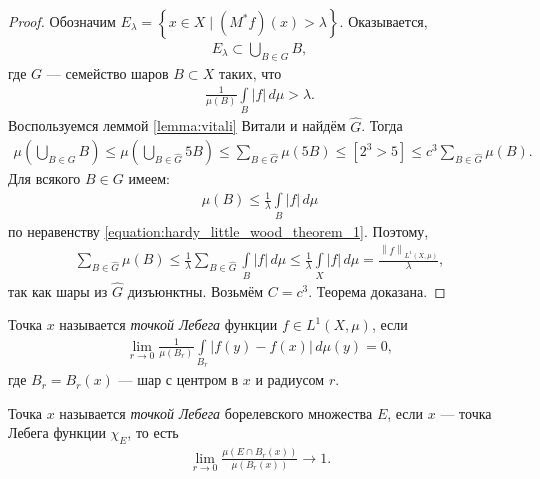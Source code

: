 \begin{proof}
 Обозначим $E_{\lambda} = \left\{ x \in X \mid (M^{\ast}f)(x) > \lambda \right\}$. Оказывается, \begin{align}
  \label{equation:hardy_little_wood_theorem_1}
  E_{\lambda} \subset \bigcup_{B \in G}  B
 ,\end{align} где $G$ --- семейство шаров $B \subset X$ таких, что \begin{align*}
  \frac{1}{\mu(B)} \int\limits_{B} \left| f \right| \, d\mu   > \lambda
 .\end{align*} Воспользуемся леммой \ref{lemma:vitali} Витали и найдём $\hat G$. Тогда \begin{align*}
 \mu \left( \bigcup_{B \in G} B \right) \leqslant \mu \left( \bigcup_{B \in \hat G} 5B  \right) \leqslant \sum_{B \in \hat G} \mu(5B) \leqslant [2^{3} > 5] \leqslant c^{3} \sum_{B \in \hat G}  \mu(B).
 \end{align*} Для всякого $B \in G$ имеем: \begin{align*}
 \mu(B) \leqslant \frac{1}{\lambda} \int\limits_{B} \left| f \right| \, d\mu
 \end{align*} по неравенству \eqref{equation:hardy_little_wood_theorem_1}. Поэтому, \begin{align*}
 \sum_{B \in \hat G}  \mu(B) \leqslant \frac{1}{\lambda} \sum_{B \in \hat G}  \int\limits_{B} \left| f \right| \, d\mu   \leqslant \frac{1}{\lambda} \int\limits_{X} \left| f \right| \, d\mu   = \frac{\left\| f \right\|_{L^{1}(X,\mu)}}{\lambda}
 ,\end{align*} так как шары из $\hat G$ дизъюнктны. Возьмём $C = c^{3}$. Теорема доказана.
\end{proof}
\begin{df}
 Точка $x$ называется \textit{точкой Лебега} функции  $f \in L^{1}(X,\mu)$, если \begin{align*}
  \lim_{r \to 0} \frac{1}{\mu(B_{r})} \int\limits_{B_{r}} \left| f(y) - f(x) \right| \, d\mu (y) = 0
 ,\end{align*} где $B_r = B_r(x)$ --- шар с центром в $x$ и радиусом $r$.
\end{df}
\begin{df}
 Точка $x$ называется \textit{точкой Лебега} борелевского множества $E$, если $x$ --- точка Лебега функции $\chi_E$, то есть \begin{align*}
  \lim\limits_{r \to 0} \frac{\mu(E \cap B_{r}(x))}{\mu(B_{r}(x))} \to 1
 .\end{align*} 
\end{df}
